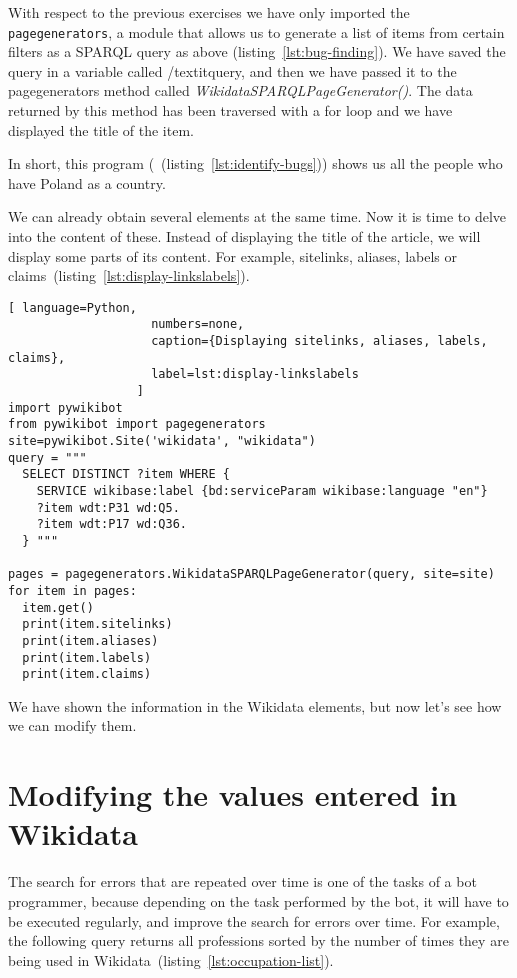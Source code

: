 With respect to the previous exercises we have only imported the \lstinline|pagegenerators|, a module that allows us to generate a list of items from certain filters as a SPARQL query as above (listing~\ref{lst:bug-finding}). We have saved the query in a variable called /textit{query}, and then we have passed it to the pagegenerators method called \textit{WikidataSPARQLPageGenerator()}. The data returned by this method has been traversed with a for loop and we have displayed the title of the item.

In short, this program (~(listing~\ref{lst:identify-bugs})) shows us all the people who have Poland as a country.

We can already obtain several elements at the same time. Now it is time to delve into the content of these. Instead of displaying the title of the article, we will display some parts of its content. For example, sitelinks, aliases, labels or claims~(listing~\ref{lst:display-linkslabels}).

\begin{lstlisting}[ language=Python,
                    numbers=none,
                    caption={Displaying sitelinks, aliases, labels, claims},
                    label=lst:display-linkslabels
                  ]
import pywikibot
from pywikibot import pagegenerators
site=pywikibot.Site('wikidata', "wikidata")
query = """
  SELECT DISTINCT ?item WHERE {
    SERVICE wikibase:label {bd:serviceParam wikibase:language "en"}
    ?item wdt:P31 wd:Q5.
    ?item wdt:P17 wd:Q36.
  } """

pages = pagegenerators.WikidataSPARQLPageGenerator(query, site=site)
for item in pages:
  item.get()
  print(item.sitelinks)
  print(item.aliases)
  print(item.labels)
  print(item.claims)
\end{lstlisting} 


We have shown the information in the Wikidata elements, but now let's see how we can modify them. 

\section{Modifying the values entered in Wikidata}
\label{sec:modifying the values entered in Wikidata eng}

The search for errors that are repeated over time is one of the tasks of a bot programmer, because depending on the task performed by the bot, it will have to be executed regularly, and improve the search for errors over time. For example, the following query returns all professions sorted by the number of times they are being used in Wikidata~(listing~\ref{lst:occupation-list}).

